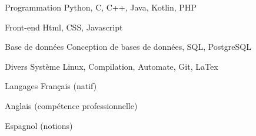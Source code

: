 

\begin{cvskills}
  \cvskill
    {Programmation} %
    {Python, C, C++, Java, Kotlin, PHP} %

  \cvskill
  {Front-end} %
  {Html, CSS, Javascript} %

  \cvskill
    {Base de données} %
    {Conception de bases de données, SQL, PostgreSQL} %

  \cvskill
    {Divers} %
    {Système Linux, Compilation, Automate, Git, LaTex} %

  \cvskill
    {Langages} %
    {Français (natif)} %

  \cvskill
    {} %
    {Anglais (compétence professionnelle)} %

  \cvskill
    {} %
    {Espagnol (notions)} %


\end{cvskills}
